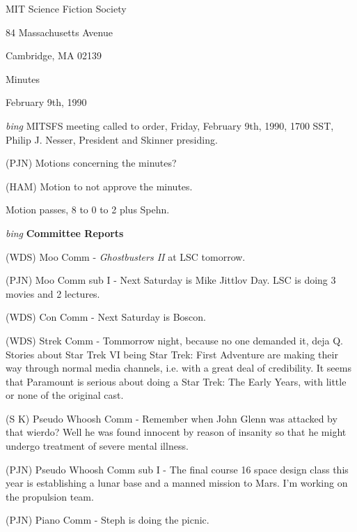 \setlength{\topmargin}{-0.5in}
\setlength{\oddsidemargin}{0.0in}
\setlength{\evensidemargin}{0.0in}
\setlength{\textheight}{9in}
\setlength{\textwidth}{6.5in}



\begin{center}
MIT Science Fiction Society

84 Massachusetts Avenue

Cambridge, MA 02139

\vspace{0.2in}
Minutes

February 9th, 1990

\end{center}
 
\vspace{0.15in}
{\em bing\/}  MITSFS meeting called to order, Friday, February 9th, 1990,
1700 SST, Philip J. Nesser, President and Skinner presiding.

(PJN) Motions concerning the minutes?

(HAM) Motion to not approve the minutes.

Motion passes, 8 to 0 to 2 plus Spehn.

\vspace{0.15in}
{\em bing\/} {\bf Committee Reports}

(WDS) Moo Comm - {\em Ghostbusters II} at LSC tomorrow.

(PJN) Moo Comm sub I - Next Saturday is Mike Jittlov Day.  LSC is
doing 3 movies and 2 lectures.

(WDS) Con Comm - Next Saturday is Boscon.

(WDS) Strek Comm - Tommorrow night, because no one demanded it, deja
Q.  Stories about Star Trek VI being Star Trek: First Adventure are
making their way through normal media channels, i.e. with a great deal
of credibility.  It seems that Paramount is serious about doing a Star
Trek: The Early Years, with little or none of the original cast.

(S K) Pseudo Whoosh Comm - Remember when John Glenn was attacked by
that wierdo?  Well he was found innocent by reason of insanity so that
he might undergo treatment of severe mental illness.

(PJN) Pseudo Whoosh Comm sub I - The final course 16 space design
class this year is establishing a lunar base and a manned mission to
Mars.  I'm working on the propulsion team.

(PJN) Piano Comm - Steph is doing the picnic.

